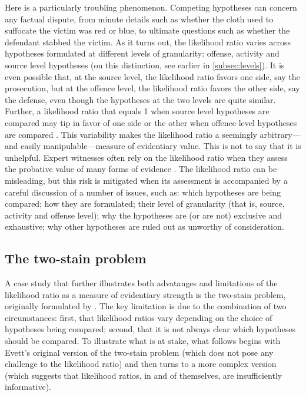 \documentclass{article}
\begin{document}
Here is a particularly troubling %
phenomenon.
Competing hypotheses can concern any factual dispute, from minute details such as whether the cloth used to suffocate the victim was red or blue, to ultimate questions such as whether the defendant stabbed the victim.  
As it turns out, the likelihood ratio varies across hypotheses formulated at different levels of granularity: offense, activity and source level hypotheses (on this distinction, see earlier in \ref{subsec:levels}). It is even possible that, at the source level, the likelihood ratio  favors one side, say the prosecution, but at the offence level, the likelihood ratio  favors the other side, say the defense, even though the hypotheses at the two levels are quite similar. Further, a likelihood ratio that equals 1 when source level hypotheses are compared may tip in favor of one side or the other when offence level hypotheses are compared \citep{fenton2014WhenNeutralEvidence}.
This variability makes the likelihood ratio a seemingly  arbitrary---and easily manipulable---measure of evidentiary value. This is not to say that it is unhelpful.
Expert witnesses often rely on the likelihood ratio when they assess the probative value of many forms of evidence \citep{enfs2015}.  
%
The likelihood ratio can be  misleading, but this risk is mitigated  when its assessment is accompanied by a careful discussion of a number of issues, such as: which hypotheses are being compared; how they are formulated; their level of granularity (that is, source, activity and offense level); why the hypotheses are (or are not) exclusive and exhaustive; why other hypotheses are ruled out as unworthy of consideration. 







 \subsection{The two-stain problem}
\label{subsec:two-stain}


A case study that further illustrates both advatanges and limitations of 
the likelihood ratio as a measure of evidentiary strength is the 
two-stain problem, originally formulated by \cite{Evett1987}. The key limitation is due to the combination of two circumstances: first, that likelihood ratios vary depending on the choice of  hypotheses being compared; second, that it is not always clear which hypotheses should be compared.  To illustrate what is at stake, what follows begins with Evett's original version of the two-stain problem (which does not pose any challenge to the likelihood ratio) and then turns to a more complex version (which suggests that  likelihood ratios, in and of themselves, are insufficiently informative).
\end{document}
